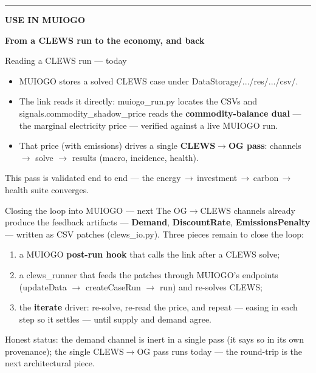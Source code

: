 \documentclass[aspectratio=169,11pt]{beamer}
\newcommand{\kick}[1]{{\scriptsize\bfseries\color{claret}\MakeUppercase{#1}}}
\newcommand{\code}[1]{{\ttfamily\small #1}}
\newcommand{\sectiondiv}[2]{%
  \begin{frame}[plain]\vfill\hspace{0.7cm}\begin{minipage}{0.86\paperwidth}
    {\color{claret}\rule{1.0cm}{2.5pt}}\par\vspace{9pt}
    \kick{#1}\par\vspace{5pt}
    {\rmfamily\bfseries\huge\color{ink}#2}\par
  \end{minipage}\vfill\end{frame}}
\begin{document}
\sectiondiv{Use in MUIOGO}{From a CLEWS run to the economy, and back}

\begin{frame}{Reading a CLEWS run --- today}
  \begin{itemize}\setlength\itemsep{7pt}\small
    \item MUIOGO stores a solved CLEWS case under \code{DataStorage/.../res/.../csv/}.
    \item The link reads it directly: \code{muiogo\_run.py} locates the CSVs and
          \code{signals.commodity\_shadow\_price} reads the \textbf{commodity-balance dual} --- the
          marginal electricity price --- verified against a live MUIOGO run.
    \item That price (with emissions) drives a single \textbf{CLEWS$\to$OG pass}: channels $\to$ solve $\to$
          results (macro, incidence, health).
  \end{itemize}
  \vfill
  {\footnotesize\color{sub}This pass is validated end to end --- the
  energy\,$\to$\,investment\,$\to$\,carbon\,$\to$\,health suite converges.}
\end{frame}

\begin{frame}{Closing the loop into MUIOGO --- next}
  The OG$\to$CLEWS channels already produce the feedback artifacts --- \textbf{Demand},
  \textbf{DiscountRate}, \textbf{EmissionsPenalty} --- written as CSV patches (\code{clews\_io.py}).
  \medskip
  Three pieces remain to close the loop:
  \begin{enumerate}\setlength\itemsep{5pt}\small
    \item a MUIOGO \textbf{post-run hook} that calls the link after a CLEWS solve;
    \item a \code{clews\_runner} that feeds the patches through MUIOGO's endpoints
          (\code{updateData} $\to$ \code{createCaseRun} $\to$ \code{run}) and re-solves CLEWS;
    \item the \textbf{iterate} driver: re-solve, re-read the price, and repeat --- easing in each step so
          it settles --- until supply and demand agree.
  \end{enumerate}
  \vfill
  {\footnotesize\color{sub}Honest status: the demand channel is inert in a single pass (it says so in its
  own provenance); the single CLEWS$\to$OG pass runs today --- the round-trip is the next architectural piece.}
\end{frame}
\end{document}
